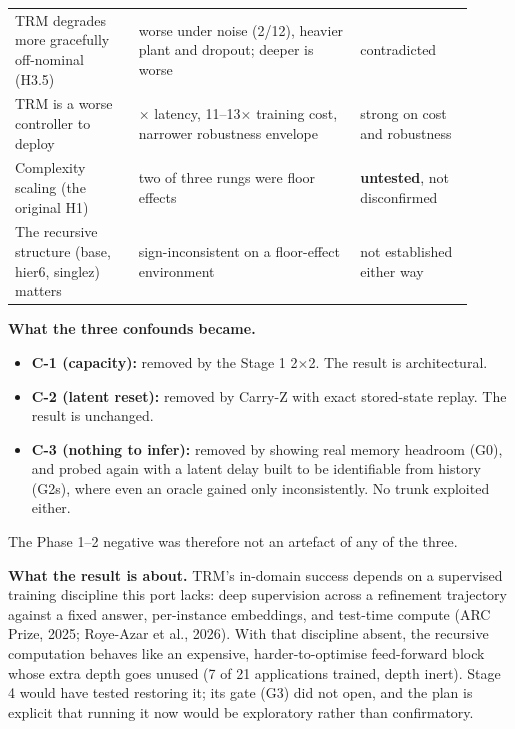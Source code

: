 \documentclass[11pt]{article}
\begin{document}
\begin{center}
\begin{tabular}{>{\raggedright\arraybackslash}p{0.247\linewidth}>{\raggedright\arraybackslash}p{0.439\linewidth}>{\raggedright\arraybackslash}p{0.220\linewidth}}
TRM degrades more gracefully off-nominal (H3.5) & worse under noise (2/12), heavier plant and dropout; deeper is worse & contradicted \\
TRM is a worse controller to deploy & 65$\times$ latency, 11--13$\times$ training cost, narrower robustness envelope & strong on cost and robustness \\
Complexity scaling (the original H1) & two of three rungs were floor effects & \textbf{untested}, not disconfirmed \\
The recursive structure (base, hier6, singlez) matters & sign-inconsistent on a floor-effect environment & not established either way \\
\bottomrule
\end{tabular}\end{center}



\textbf{What the three confounds became.}

\begin{itemize}
\item \textbf{C-1 (capacity):} removed by the Stage 1 2$\times$2. The result is architectural.
\item \textbf{C-2 (latent reset):} removed by Carry-Z with exact stored-state replay. The result is unchanged.
\item \textbf{C-3 (nothing to infer):} removed by showing real memory headroom (G0), and probed again with a latent delay built to be identifiable from history (G2s), where even an oracle gained only inconsistently. No trunk exploited either.
\end{itemize}



The Phase 1--2 negative was therefore not an artefact of any of the three.



\textbf{What the result is about.} TRM's in-domain success depends on a supervised training discipline this port lacks: deep supervision across a refinement trajectory against a fixed answer, per-instance embeddings, and test-time compute (ARC Prize, 2025; Roye-Azar et al., 2026). With that discipline absent, the recursive computation behaves like an expensive, harder-to-optimise feed-forward block whose extra depth goes unused (7 of 21 applications trained, depth inert). Stage 4 would have tested restoring it; its gate (G3) did not open, and the plan is explicit that running it now would be exploratory rather than confirmatory.
\end{document}
